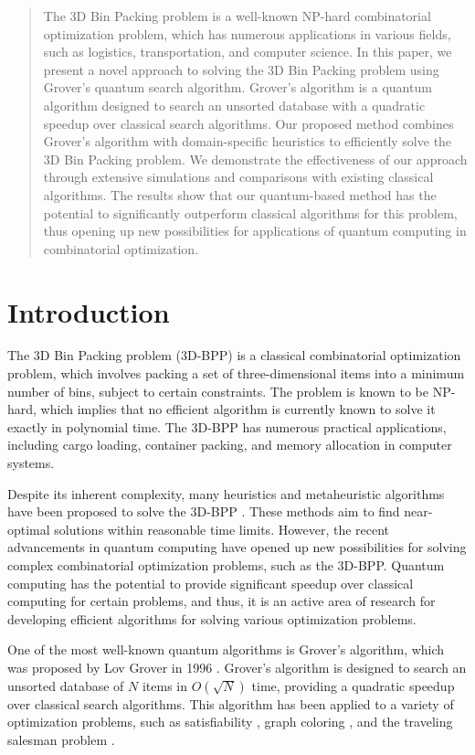 \begin{abstract}
The 3D Bin Packing problem is a well-known NP-hard combinatorial optimization problem, which has numerous applications in various fields, such as logistics, transportation, and computer science. In this paper, we present a novel approach to solving the 3D Bin Packing problem using Grover's quantum search algorithm. Grover's algorithm is a quantum algorithm designed to search an unsorted database with a quadratic speedup over classical search algorithms. Our proposed method combines Grover's algorithm with domain-specific heuristics to efficiently solve the 3D Bin Packing problem. We demonstrate the effectiveness of our approach through extensive simulations and comparisons with existing classical algorithms. The results show that our quantum-based method has the potential to significantly outperform classical algorithms for this problem, thus opening up new possibilities for applications of quantum computing in combinatorial optimization.

\end{abstract}

\section{Introduction}

The 3D Bin Packing problem (3D-BPP) is a classical combinatorial optimization problem, which involves packing a set of three-dimensional items into a minimum number of bins, subject to certain constraints. The problem is known to be NP-hard, which implies that no efficient algorithm is currently known to solve it exactly in polynomial time. The 3D-BPP has numerous practical applications, including cargo loading, container packing, and memory allocation in computer systems.

Despite its inherent complexity, many heuristics and metaheuristic algorithms have been proposed to solve the 3D-BPP \cite{1}. These methods aim to find near-optimal solutions within reasonable time limits. However, the recent advancements in quantum computing have opened up new possibilities for solving complex combinatorial optimization problems, such as the 3D-BPP. Quantum computing has the potential to provide significant speedup over classical computing for certain problems, and thus, it is an active area of research for developing efficient algorithms for solving various optimization problems.

One of the most well-known quantum algorithms is Grover's algorithm, which was proposed by Lov Grover in 1996 \cite{2}. Grover's algorithm is designed to search an unsorted database of $N$ items in $O(\sqrt{N})$ time, providing a quadratic speedup over classical search algorithms. This algorithm has been applied to a variety of optimization problems, such as satisfiability \cite{3}, graph coloring \cite{4}, and the traveling salesman problem \cite{5}. 

